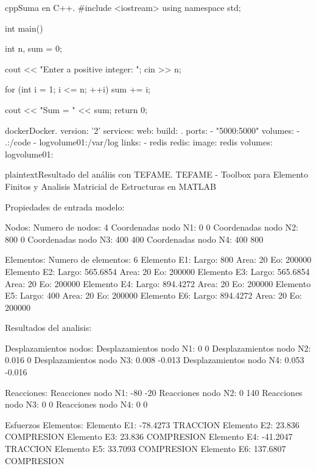 \clearpage
\begin{sourcecode}{cpp}{Suma en C++.}
#include <iostream>
using namespace std;

int main()
{
	int n, sum = 0;
	
	cout << "Enter a positive integer: ";
	cin >> n;
	
	for (int i = 1; i <= n; ++i) {
		sum += i;
	}
	
	cout << "Sum = " << sum;
	return 0;
}
\end{sourcecode}

\begin{sourcecode}{docker}{Docker.}
version: '2'
services:
web:
build: .
ports:
- "5000:5000"
volumes:
- .:/code
- logvolume01:/var/log
links:
- redis
redis:
image: redis
volumes:
logvolume01: {}
\end{sourcecode}

\begin{sourcecode}{plaintext}{Resultado del análiis con TEFAME.}
TEFAME - Toolbox para Elemento Finitos y Analisis
Matricial de Estructuras en MATLAB

Propiedades de entrada modelo:

Nodos: 
Numero de nodos: 4 
Coordenadas nodo N1: 0 0
Coordenadas nodo N2: 800 0
Coordenadas nodo N3: 400 400
Coordenadas nodo N4: 400 800

Elementos: 
Numero de elementos: 6 
Elemento E1:	Largo: 800         Area: 20        Eo: 200000    
Elemento E2:	Largo: 565.6854    Area: 20        Eo: 200000    
Elemento E3:	Largo: 565.6854    Area: 20        Eo: 200000    
Elemento E4:	Largo: 894.4272    Area: 20        Eo: 200000    
Elemento E5:	Largo: 400         Area: 20        Eo: 200000    
Elemento E6:	Largo: 894.4272    Area: 20        Eo: 200000    

Resultados del analisis:

Desplazamientos nodos: 
Desplazamientos nodo N1: 0 0
Desplazamientos nodo N2: 0.016 0
Desplazamientos nodo N3: 0.008 -0.013
Desplazamientos nodo N4: 0.053 -0.016

Reacciones: 
Reacciones nodo N1: -80 -20
Reacciones nodo N2: 0 140
Reacciones nodo N3: 0 0
Reacciones nodo N4: 0 0

Esfuerzos Elementos: 
Elemento E1: -78.4273       TRACCION
Elemento E2: 23.836         COMPRESION
Elemento E3: 23.836         COMPRESION
Elemento E4: -41.2047       TRACCION
Elemento E5: 33.7093        COMPRESION
Elemento E6: 137.6807       COMPRESION
\end{sourcecode}

